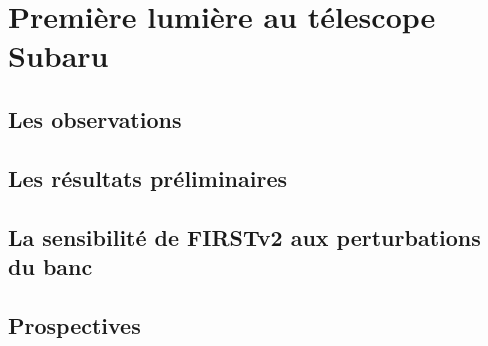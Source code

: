 \section{Première lumière au télescope Subaru}

\subsection{Les observations}

\subsection{Les résultats préliminaires}

\subsection{La sensibilité de FIRSTv2 aux perturbations du banc}

\subsection{Prospectives}

